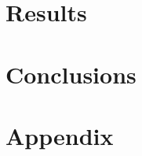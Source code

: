 \documentclass[a4paper,fleqn]{cas-dc}
\begin{document}
\section{Results} \label{CH: Results}

\section{Conclusions}

\clearpage
%



\clearpage \appendix \label{appendix}
\section{Appendix} 
\end{document}
